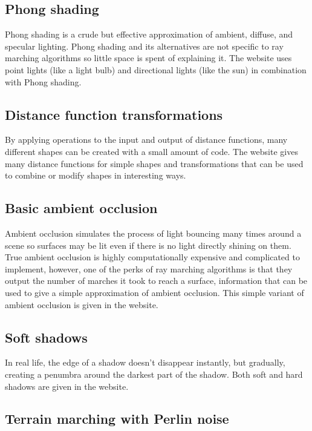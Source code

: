 \documentclass[parskip=full]{scrartcl}
\begin{document}
\subsection{Phong shading}

Phong shading is a crude but effective approximation of ambient, diffuse, and
specular lighting. Phong shading and its alternatives are not specific to
ray marching algorithms so little space is spent of explaining it. The website
uses point lights (like a light bulb) and directional lights (like the sun) in
combination with Phong shading.

\subsection{Distance function transformations}

By applying operations to the input and output of distance functions, many
different shapes can be created with a small amount of code. The website
gives many distance functions for simple shapes and transformations that can
be used to combine or modify shapes in interesting ways.

\subsection{Basic ambient occlusion}

Ambient occlusion simulates the process of light bouncing many times around a
scene so surfaces may be lit even if there is no light directly shining on
them. True ambient occlusion is highly computationally expensive and
complicated to implement, however, one of the perks of ray marching algorithms
is that they output the number of marches it took to reach a surface,
information that can be used to give a simple approximation of ambient
occlusion. This simple variant of ambient occlusion is given in the website.

\subsection{Soft shadows}

In real life, the edge of a shadow doesn't disappear instantly, but gradually,
creating a penumbra around the darkest part of the shadow. Both soft and hard
shadows are given in the website.

\subsection{Terrain marching with Perlin noise}
\end{document}
